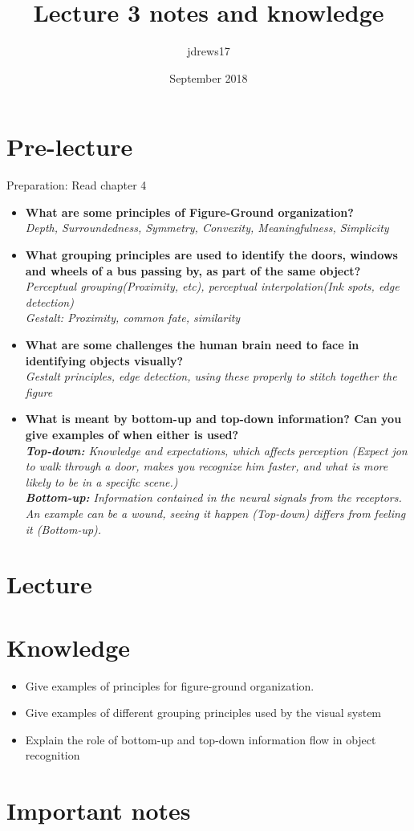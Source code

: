 \documentclass{article}
\title{Lecture 3 notes and knowledge}
\author{jdrews17}
\date{September 2018}
\begin{document}
\maketitle
\newpage

\section{Pre-lecture}
Preparation: Read chapter 4\\
\begin{itemize}
  \item \textbf{What are some principles of Figure-Ground organization?}\\
    \textit{Depth, Surroundedness, Symmetry, Convexity, Meaningfulness, Simplicity}
  \item \textbf{What grouping principles are used to identify the doors, windows and wheels of a bus passing by, as part of the same object?}\\
    \textit{Perceptual grouping(Proximity, etc), perceptual interpolation(Ink spots, edge detection)\\Gestalt: Proximity, common fate, similarity}
  \item \textbf{What are some challenges the human brain need to face in identifying objects visually?}\\
    \textit{Gestalt principles, edge detection, using these properly to stitch together the figure}
  \item \textbf{What is meant by bottom-up and top-down information? Can you give examples of when either is used?}\\
    \textit{\textbf{Top-down:} Knowledge and expectations, which affects perception (Expect jon to walk through a door, makes you recognize him faster, and what is more likely to be in a specific scene.)\\\textbf{Bottom-up:} Information contained in the neural signals from the receptors.\\An example can be a wound, seeing it happen (Top-down) differs from feeling it (Bottom-up).}
\end{itemize}

\section{Lecture}
\section{Knowledge}
\begin{itemize}
  \item Give examples of principles for figure-ground organization.
  \item Give examples of different grouping principles used by the visual system
  \item Explain the role of bottom-up and top-down information flow in object recognition
\end{itemize}

\section{Important notes}
\end{document}
